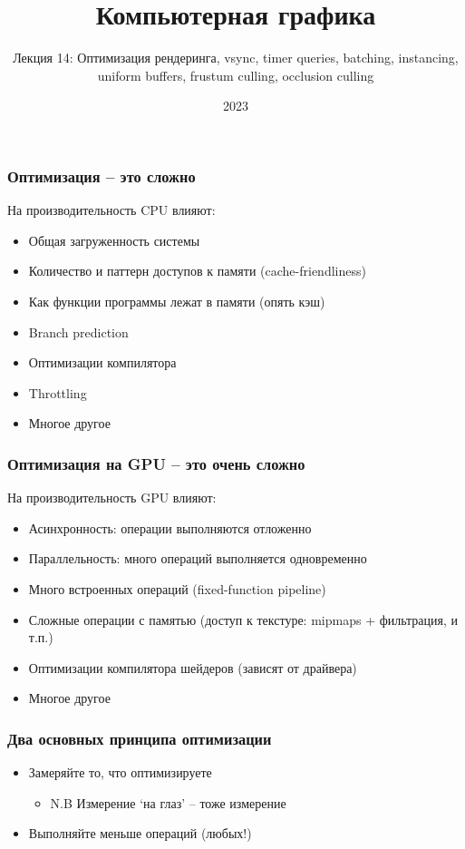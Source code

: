 \documentclass{beamer}
\title{Компьютерная графика}
\subtitle{Лекция 14: Оптимизация рендеринга, vsync, timer queries, batching, instancing, uniform buffers, frustum culling, occlusion culling}
\date{2023}
\begin{document}
\frame{\titlepage}

\begin{frame}[fragile]
\frametitle{Оптимизация -- это сложно}
На производительность CPU влияют:
\pause
\begin{itemize}
\item Общая загруженность системы
\pause
\item Количество и паттерн доступов к памяти (cache-friendliness)
\pause
\item Как функции программы лежат в памяти (опять кэш)
\pause
\item Branch prediction
\pause
\item Оптимизации компилятора
\pause
\item Throttling
\pause
\item Многое другое
\end{itemize}
\end{frame}

\begin{frame}[fragile]
\frametitle{Оптимизация на GPU -- это очень сложно}
На производительность GPU влияют:
\pause
\begin{itemize}
\item Асинхронность: операции выполняются отложенно
\pause
\item Параллельность: много операций выполняется одновременно
\pause
\item Много встроенных операций (fixed-function pipeline)
\pause
\item Сложные операции с памятью (доступ к текстуре: mipmaps + фильтрация, и т.п.)
\pause
\item Оптимизации компилятора шейдеров (зависят от драйвера)
\pause
\item Многое другое
\end{itemize}
\end{frame}

\begin{frame}[fragile]
\frametitle{Два основных принципа оптимизации}
\begin{itemize}
\item Замеряйте то, что оптимизируете
\pause
\begin{itemize}
\item N.B Измерение `на глаз' -- тоже измерение
\end{itemize}
\pause
\item Выполняйте меньше операций (любых!)
\end{itemize}
\end{frame}
\end{document}
